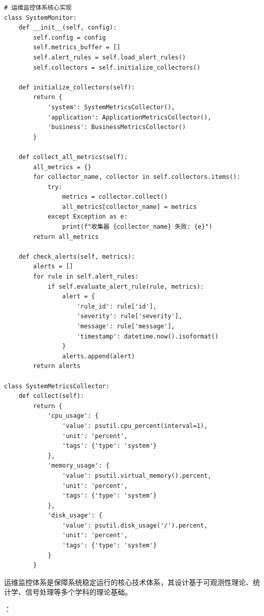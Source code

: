 \begin{lstlisting}[style=python]
# 运维监控体系核心实现
class SystemMonitor:
    def __init__(self, config):
        self.config = config
        self.metrics_buffer = []
        self.alert_rules = self.load_alert_rules()
        self.collectors = self.initialize_collectors()
        
    def initialize_collectors(self):
        return {
            'system': SystemMetricsCollector(),
            'application': ApplicationMetricsCollector(),
            'business': BusinessMetricsCollector()
        }
    
    def collect_all_metrics(self):
        all_metrics = {}
        for collector_name, collector in self.collectors.items():
            try:
                metrics = collector.collect()
                all_metrics[collector_name] = metrics
            except Exception as e:
                print(f"收集器 {collector_name} 失败: {e}")
        return all_metrics
    
    def check_alerts(self, metrics):
        alerts = []
        for rule in self.alert_rules:
            if self.evaluate_alert_rule(rule, metrics):
                alert = {
                    'rule_id': rule['id'],
                    'severity': rule['severity'],
                    'message': rule['message'],
                    'timestamp': datetime.now().isoformat()
                }
                alerts.append(alert)
        return alerts

class SystemMetricsCollector:
    def collect(self):
        return {
            'cpu_usage': {
                'value': psutil.cpu_percent(interval=1),
                'unit': 'percent',
                'tags': {'type': 'system'}
            },
            'memory_usage': {
                'value': psutil.virtual_memory().percent,
                'unit': 'percent',
                'tags': {'type': 'system'}
            },
            'disk_usage': {
                'value': psutil.disk_usage('/').percent,
                'unit': 'percent',
                'tags': {'type': 'system'}
            }
        }
\end{lstlisting}


运维监控体系是保障系统稳定运行的核心技术体系，其设计基于可观测性理论、统计学、信号处理等多个学科的理论基础。

：


